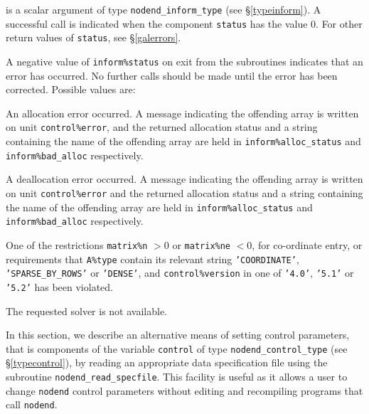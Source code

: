 \documentclass{galahad}
\newcommand{\packagename}{nodend}
\begin{document}
\begin{description}
\begin{description}
 is a scalar \intentout argument of type
{\tt \packagename\_inform\_type}
(see \S\ref{typeinform}).
A successful call is indicated when the  component {\tt status} has the value 0.
For other return values of {\tt status}, see \S\ref{galerrors}.
\end{description}


\galerrors
A negative value of {\tt inform\%status} on exit from the subroutines
indicates that an error has occurred. No further calls should be made
until the error has been corrected. Possible values are:

\begin{description}

\itt{\galerrallocate} An allocation error occurred. A message indicating
the offending
array is written on unit {\tt control\%error}, and the returned allocation
status and a string containing the name of the offending array
are held in {\tt inform\%alloc\_\-status}
and {\tt inform\%bad\_alloc} respectively.

\itt{\galerrdeallocate} A deallocation error occurred.
A message indicating the offending
array is written on unit {\tt control\%error} and the returned allocation
status and a string containing the name of the offending array
are held in {\tt inform\%alloc\_\-status}
and {\tt inform\%bad\_alloc} respectively.

\itt{\galerrrestrictions} One of the restrictions
 {\tt matrix\%n} $> 0$ or
 {\tt matrix\%ne} $< 0$, for co-ordinate entry,
  or requirements that {\tt A\%type}
  contain its relevant string
 {\tt 'COORDINATE'}, {\tt 'SPARSE\_BY\_ROWS'} or {\tt 'DENSE'}, and
 {\tt control\%version} in one of {\tt '4.0'}, {\tt '5.1'} or {\tt '5.2'}
  has been violated.

\itt{\galunknownsolver} The requested solver is not available.

\end{description}


\galcontrolfeatures
\noindent In this section, we describe an alternative means of setting
control parameters, that is components of the variable {\tt control} of type
{\tt \packagename\_control\_type}
(see \S\ref{typecontrol}),
by reading an appropriate data specification file using the
subroutine {\tt \packagename\_read\_specfile}. This facility
is useful as it allows a user to change  {\tt \packagename} control parameters
without editing and recompiling programs that call {\tt \packagename}.


\end{description}
\end{document}

